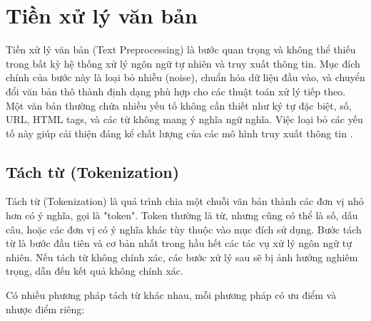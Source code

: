 \documentclass[../BTL.tex]{subfiles}
\begin{document}
\section{Tiền xử lý văn bản}
Tiền xử lý văn bản (Text Preprocessing) là bước quan trọng và không thể thiếu trong bất kỳ hệ thống xử lý ngôn ngữ tự nhiên và truy xuất thông tin. Mục đích chính của bước này là loại bỏ nhiễu (noise), chuẩn hóa dữ liệu đầu vào, và chuyển đổi văn bản thô thành định dạng phù hợp cho các thuật toán xử lý tiếp theo. Một văn bản thường chứa nhiều yếu tố không cần thiết như ký tự đặc biệt, số, URL, HTML tags, và các từ không mang ý nghĩa ngữ nghĩa. Việc loại bỏ các yếu tố này giúp cải thiện đáng kể chất lượng của các mô hình truy xuất thông tin \cite{manning2008introduction}.

\subsection{Tách từ (Tokenization)}
Tách từ (Tokenization) là quá trình chia một chuỗi văn bản thành các đơn vị nhỏ hơn có ý nghĩa, gọi là "token". Token thường là từ, nhưng cũng có thể là số, dấu câu, hoặc các đơn vị có ý nghĩa khác tùy thuộc vào mục đích sử dụng. Bước tách từ là bước đầu tiên và cơ bản nhất trong hầu hết các tác vụ xử lý ngôn ngữ tự nhiên. Nếu tách từ không chính xác, các bước xử lý sau sẽ bị ảnh hưởng nghiêm trọng, dẫn đến kết quả không chính xác.

Có nhiều phương pháp tách từ khác nhau, mỗi phương pháp có ưu điểm và nhược điểm riêng:
\end{document}
